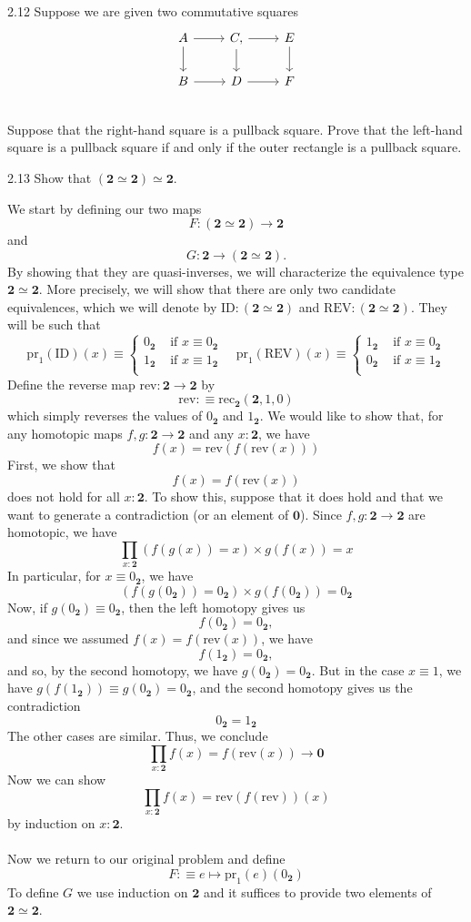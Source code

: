 \documentclass[14pt]{extarticle}
\newcommand{\0}{{\mathbf 0}}
\newcommand{\1}{{\mathbf 1}}
\newcommand{\2}{{\mathbf 2}}
\newcommand{\mt}{\mapsto}
\newcommand{\rec}{\mathrm{rec}}
\newcommand{\pr}{\mathrm{pr}}
\begin{document}
\begin{prob}{2.12}{}
Suppose we are given two commutative squares 
\[
\begin{tikzcd}
A \arrow[r] \arrow[d] & C \arrow[r] \arrow[d], & E  \arrow[d]\\
B \arrow[r] & D \arrow[r] & F \\
\end{tikzcd}
\]
Suppose that the right-hand square is a pullback square. Prove that the left-hand square is a pullback square if and only if the outer rectangle is a pullback square.
\end{prob}

\begin{prob}{2.13}{}
Show that $(\2 \simeq \2) \simeq \2$.
\end{prob}
We start by defining our two maps \[F : (\2 \simeq \2) \to  \2\] and \[G : \2 \to (\2 \simeq \2).\]
By showing that they are quasi-inverses, we will characterize the equivalence type $\2 \simeq \2$.
More precisely, we will show that there are only two candidate equivalences, which we will denote by $\text{ID} : (\2 \simeq \2)$ and $\text{REV} : (\2 \simeq \2)$. They will be such that
\[
\pr_1(\text{ID})(x) \equiv 
\left\{ \begin{array}{ll}
0_\2 &\text{ if } x \equiv 0_\2 \\
1_\2 &\text{ if } x \equiv 1_\2 \\
\end{array}
\right.
\quad 
\pr_1(\text{REV})(x) \equiv 
\left\{ \begin{array}{ll}
1_\2 &\text{ if } x \equiv 0_\2 \\
0_\2 &\text{ if } x \equiv 1_\2 \\
\end{array}
\right.
\]
Define the reverse map $\text{rev} : \2 \to \2$ by 
\[\text{rev} : \equiv \rec_\2(\2,1,0)\] which simply reverses the values of $0_\2$ and $1_\2$. We would like to show that, for any homotopic maps $f,g : \2 \to \2$ and any $x : \2$, we have
\[f(x) = \text{rev}(f(\text{rev}(x)))\] First, we show that 
\[f(x) = f(\text{rev}(x))\] does not hold for all $x : \2$. To show this, suppose that it does hold and that we want to generate a contradiction (or an element of $\0$). Since $f,g : \2 \to \2$ are homotopic, we have
\[\prod_{x:\2}(f(g(x)) = x) \times g(f(x)) = x\] In particular, for $x \equiv 0_\2$, we have
\[(f(g(0_\2)) = 0_\2) \times g(f(0_\2)) = 0_\2\]
Now, if $g(0_\2) \equiv 0_\2$, then the left homotopy gives us
\[f(0_\2) = 0_\2,\] and since we assumed $f(x) = f(\text{rev}(x))$, we have \[f(1_\2) = 0_\2,\] and so, by the second homotopy, we have $g(0_\2) = 0_\2$. But in the case $x \equiv 1$, we have $g(f(1_\2)) \equiv g(0_\2) = 0_\2$, and the second homotopy gives us the contradiction
\[0_\2 = 1_\2\]
The other cases are similar. Thus, we conclude
\[\prod_{x:\2}f(x) = f(\text{rev}(x)) \to \0\] Now we can show 
\[\prod_{x:\2}f(x) = \text{rev}(f(\text{rev}))(x)\] by induction on $x : \2$. \\\\
Now we return to our original problem and define
\[F :\equiv e \mt \pr_1(e)(0_\2)\] To define $G$ we use induction on $\2$ and it suffices to provide two elements of $\2 \simeq \2$.
\end{document}
